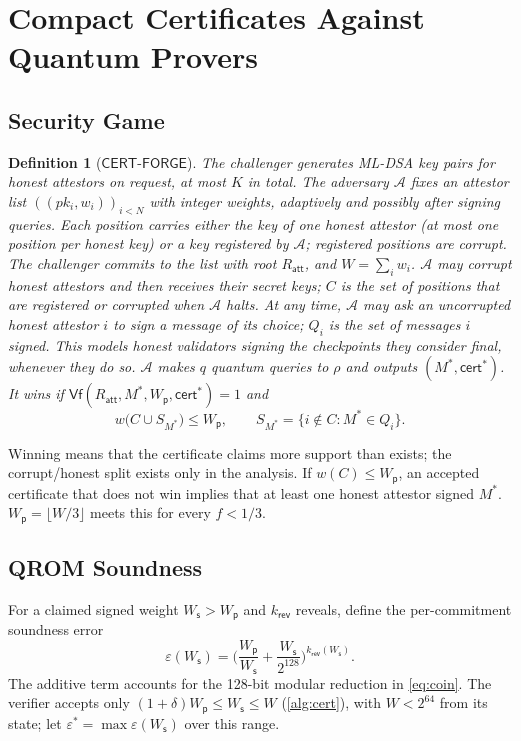 \documentclass[10pt,journal,compsoc]{IEEEtran}
\theoremstyle{tplain}
\theoremstyle{tdef}
\newtheorem{definition}{Definition}
\theoremstyle{remark}
\newcommand{\Ws}{W_{\mathsf{s}}}
\newcommand{\Wp}{W_{\mathsf{p}}}
\newcommand{\Ratt}{R_{\mathsf{att}}}
\newcommand{\kr}{k_{\mathsf{rev}}}
\newcommand{\cert}{\mathsf{cert}}
\newcommand{\RO}{\rho}
\begin{document}
\section{Compact Certificates Against Quantum Provers}\label{sec:cert}

\subsection{Security Game}
\begin{definition}[$\mathsf{CERT\text{-}FORGE}$]\label{def:game}
The challenger generates ML-DSA key pairs for honest attestors on request, at most $K$ in total. The adversary $\mathcal A$ fixes an attestor list $((pk_i,w_i))_{i<N}$ with integer weights, adaptively and possibly after signing queries. Each position carries either the key of one honest attestor (at most one position per honest key) or a key \emph{registered} by $\mathcal A$; registered positions are corrupt. The challenger commits to the list with root $\Ratt$, and $W=\sum_iw_i$. $\mathcal A$ may corrupt honest attestors and then receives their secret keys; $C$ is the set of positions that are registered or corrupted when $\mathcal A$ halts. At any time, $\mathcal A$ may ask an uncorrupted honest attestor $i$ to sign a message of its choice; $Q_i$ is the set of messages $i$ signed. This models honest validators signing the checkpoints they consider final, whenever they do so. $\mathcal A$ makes $q$ quantum queries to $\RO$ and outputs $(M^\ast,\cert^\ast)$. It wins if $\mathsf{Vf}(\Ratt,M^\ast,\Wp,\cert^\ast)=1$ and
\[w\big(C\cup S_{M^\ast}\big)\le \Wp,\qquad S_{M^\ast}=\{i\notin C: M^\ast\in Q_i\}.\]
\end{definition}

Winning means that the certificate claims more support than exists; the corrupt/honest split exists only in the analysis. If $w(C)\le\Wp$, an accepted certificate that does not win implies that at least one honest attestor signed $M^\ast$. $\Wp=\lfloor W/3\rfloor$ meets this for every $f<1/3$.

\subsection{QROM Soundness}
For a claimed signed weight $\Ws>\Wp$ and $\kr$ reveals, define the per-commitment soundness error
\begin{equation}\label{eq:eps}
\varepsilon(\Ws)=\Big(\frac{\Wp}{\Ws}+\frac{\Ws}{2^{128}}\Big)^{\kr(\Ws)}.
\end{equation}
The additive term accounts for the 128-bit modular reduction in \cref{eq:coin}. The verifier accepts only $(1+\delta)\Wp\le\Ws\le W$ (\cref{alg:cert}), with $W<2^{64}$ from its state; let $\varepsilon^\ast=\max\varepsilon(\Ws)$ over this range.
\end{document}
